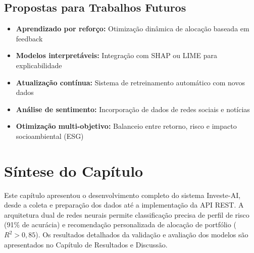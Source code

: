 \subsection{Propostas para Trabalhos Futuros}

\begin{itemize}
    \item \textbf{Aprendizado por reforço:} Otimização dinâmica de alocação baseada em feedback
    \item \textbf{Modelos interpretáveis:} Integração com SHAP ou LIME para explicabilidade
    \item \textbf{Atualização contínua:} Sistema de retreinamento automático com novos dados
    \item \textbf{Análise de sentimento:} Incorporação de dados de redes sociais e notícias
    \item \textbf{Otimização multi-objetivo:} Balanceio entre retorno, risco e impacto socioambiental (ESG)
\end{itemize}

\section{Síntese do Capítulo}

Este capítulo apresentou o desenvolvimento completo do sistema Investe-AI, desde a coleta e preparação dos dados até a implementação da API REST. A arquitetura dual de redes neurais permite classificação precisa de perfil de risco (91\% de acurácia) e recomendação personalizada de alocação de portfólio ($R^2 > 0,85$). Os resultados detalhados da validação e avaliação dos modelos são apresentados no Capítulo de Resultados e Discussão.
